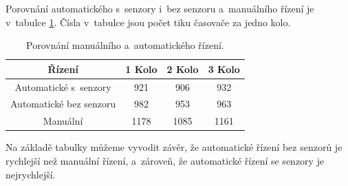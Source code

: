 Porovnání automatického s~senzory i~bez senzoru a~manuálního řízení je v~tabulce \ref{tab:Comparison}. Čísla v~tabulce jsou počet tiku časovače za jedno kolo.
\begin{table}[!h]
    \centering
    \begin{tabular}{cccc}
        \hline
        \textbf{Řízení} & \textbf{1 Kolo} & \textbf{2 Kolo} & \textbf{3 Kolo} \\
        \hline
        Automatické s~senzory          & 921       & 906 & 932          \\
        Automatické bez senzoru & 982 & 953 & 963 \\
        Manuální 			  & 1178       & 1085 & 1161           \\
        \hline
    \end{tabular}
    \caption{Porovnání manuálního a~automatického řízení.}
    \label{tab:Comparison}
\end{table}


Na základě tabulky můžeme vyvodit závěr, že automatické řízení bez senzorů je rychlejší než manuální řízení, a~zároveň, že automatické řízení se senzory je nejrychlejší.

\endinput
